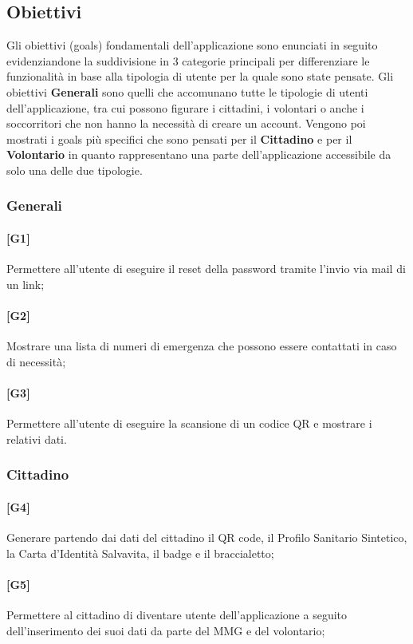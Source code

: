 \documentclass[12pt,a4paper,twoside,openright,titlepage]{book}
\begin{document}
\subsection{Obiettivi}
Gli obiettivi (goals) fondamentali dell'applicazione sono enunciati in seguito evidenziandone la suddivisione in 3 categorie principali per differenziare le funzionalità in base alla tipologia di utente per la quale sono state pensate. Gli obiettivi \textbf{Generali} sono quelli che accomunano tutte le tipologie di utenti dell'applicazione, tra cui possono figurare i cittadini, i volontari o anche i soccorritori che non hanno la necessità di creare un account. Vengono poi mostrati i goals più specifici che sono pensati per il \textbf{Cittadino} e per il \textbf{Volontario} in quanto rappresentano una parte dell'applicazione accessibile da solo una delle due tipologie. 

\subsubsection{Generali}
\paragraph{[G1]} Permettere all'utente di eseguire il reset della password tramite l'invio via mail di un link;
\paragraph{[G2]} Mostrare una lista di numeri di emergenza che possono essere contattati in caso di necessità;
\paragraph{[G3]} Permettere all'utente di eseguire la scansione di un codice QR e mostrare i relativi dati.

\subsubsection{Cittadino}
\paragraph{[G4]} Generare partendo dai dati del cittadino il QR code, il Profilo Sanitario Sintetico, la Carta d'Identità Salvavita, il badge e il braccialetto;
\paragraph{[G5]} Permettere al cittadino di diventare utente dell'applicazione a seguito dell'inserimento dei suoi dati da parte del MMG e del volontario;
\end{document}
